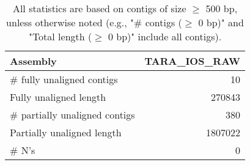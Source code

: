 \documentclass[12pt,a4paper]{article}
\begin{document}
\begin{table}[ht]
\begin{center}
\caption{All statistics are based on contigs of size $\geq$ 500 bp, unless otherwise noted (e.g., "\# contigs ($\geq$ 0 bp)" and "Total length ($\geq$ 0 bp)" include all contigs).}
\begin{tabular}{|l*{1}{|r}|}
\hline
Assembly & TARA\_IOS\_RAW \\ \hline
\# fully unaligned contigs & 10 \\ \hline
Fully unaligned length & 270843 \\ \hline
\# partially unaligned contigs & 380 \\ \hline
Partially unaligned length & 1807022 \\ \hline
\# N's & 0 \\ \hline
\end{tabular}
\end{center}
\end{table}
\end{document}
